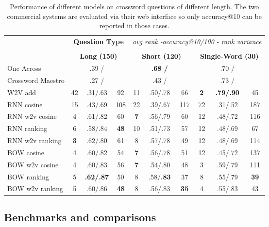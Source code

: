 \begin{table*}[ht]
{\small
\hfill{}
\begin{tabular}{l|ccc|ccc|ccc|}
\multicolumn{1}{c}{} & \multicolumn{3}{c}{{\bf Question Type }}& \multicolumn{6}{|c|}{\emph{avg rank -accuracy@10/100 - rank variance} } \\
\multicolumn{10}{c}{} \\
\multicolumn{1}{c}{\textbf{}}&\multicolumn{3}{|c|}{\textbf{Long (150)}}& \multicolumn{3}{|c|}{\textbf{Short (120)}} & \multicolumn{3}{|c|}{\textbf{Single-Word (30)}}  \\
\hline
One Across & & .39 / && & \bf .68 / &&& .70 / &  \\
Crossword Maestro& & .27 /&& & .43 /&&& .73 / & \\
\hdashline
W2V add & 42  & .31/.63 & 92  & 11 & .50/.78 & 66 & \bf 2 & \bf .79/.90 & 45  \\
\hdashline
RNN cosine	& 15 &  .43/.69 & 108 & 22 & .39/.67 & 117 & 72 & .31/.52 & 187 \\
RNN w2v cosine &	4 & .61/.82 & 60 & \bf 7 & .56/.79 & 60 & 12 & .48/.72 & 116 \\
RNN ranking 	& 6 & .58/.84 & \bf 48 & 10 & .51/.73 & 57 & 12 & .48/.69 & 67 \\
RNN w2v ranking &	\bf 3 & .62/.80 & 61 & 8 & .57/.78 & 49 & 12 & .48/.69 & 114 \\
BOW cosine & 4 & .60/.82 & 54 & \bf 7 & .56/.78 & 51 & 12 & .45/.72 & 137 \\
BOW w2v cosine & 4 & .60/.83 & 56 & \bf 7  & .54/.80 & 48 & 3 & .59/.79 & 111 \\
BOW ranking	& 5 & \bf .62/.87 & 50 & 8 & .58/\bf .83 & 37 & 8 & .55/.79 & \bf 39 \\
BOW w2v ranking & 5 & .60/.86 & \bf 48 & 8 & .56/.83 & \bf 35 & 4 & .55/.83 & 43 \\
\end{tabular}}
\hfill{}
\caption{Performance of different models on crossword questions of different length. The two commercial systems are evaluated via their web interface so only accuracy@10 can be reported in those cases. }
\label{results2}
\label{tb:tablename}
\end{table*}

\subsection{Benchmarks and comparisons}

